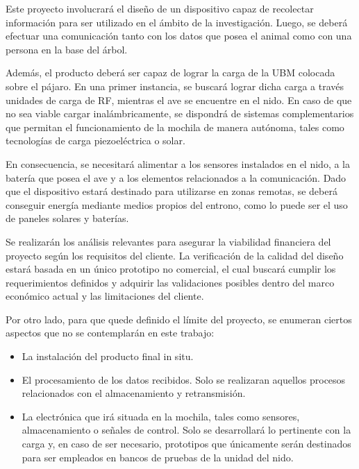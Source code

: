 Este proyecto involucrará el diseño de un dispositivo capaz de recolectar información para ser utilizado en el ámbito de la investigación. Luego, se deberá efectuar una comunicación tanto con los datos que posea el animal como con una persona en la base del árbol.

Además, el producto deberá ser capaz de lograr la carga de la UBM colocada sobre el pájaro. En una primer instancia, se buscará lograr dicha carga a través unidades de carga de RF, mientras el ave se encuentre en el nido. En caso de que no sea viable cargar inalámbricamente, se dispondrá de sistemas complementarios que permitan el funcionamiento de la mochila de manera autónoma, tales como tecnologías de carga piezoeléctrica o solar. 

En consecuencia, se necesitará alimentar a los sensores instalados en el nido, a la batería que posea el ave y a los elementos relacionados a la comunicación. Dado que el dispositivo estará destinado para utilizarse en zonas remotas, se deberá conseguir energía mediante medios propios del entrono, como lo puede ser el uso de paneles solares y baterías.

Se realizarán los análisis relevantes para asegurar la viabilidad financiera del proyecto según los requisitos del cliente. La verificación de la calidad del diseño estará basada en un único prototipo no comercial, el cual buscará cumplir los requerimientos definidos y adquirir las validaciones posibles dentro del marco económico actual y las limitaciones del cliente. 


Por otro lado, para que quede definido el límite del proyecto, se enumeran ciertos aspectos que no se contemplarán en este trabajo:
\begin{itemize}
	\item La instalación del producto final in situ.
	\item El procesamiento de los datos recibidos. Solo se realizaran aquellos procesos relacionados con el almacenamiento y retransmisión.
	\item La electrónica que irá situada en la mochila, tales como sensores, almacenamiento o señales de control. Solo se desarrollará lo pertinente con la carga y, en caso de ser necesario, prototipos que únicamente serán destinados para ser empleados en bancos de pruebas de la unidad del nido. 
\end{itemize}

